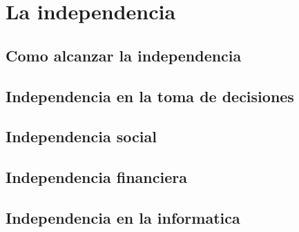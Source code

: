 \chapter{La independencia}
\section{Como alcanzar la independencia}
\section{Independencia en la toma de decisiones}
\section{Independencia social}
\section{Independencia financiera}
\section{Independencia en la informatica}
